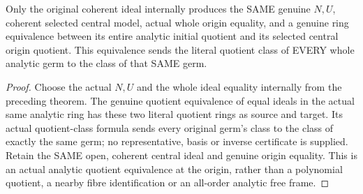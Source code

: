 \begin{theorem}
\label{hir:relative-normal-graph-central-literal-analytic-quotient}
\leanok
Only the original coherent ideal internally produces the SAME genuine $N,U$, coherent selected central model, actual whole origin equality, and a genuine ring equivalence between its entire analytic initial quotient and its selected central origin quotient. This equivalence sends the literal quotient class of EVERY whole analytic germ to the class of that SAME germ.
\end{theorem}
\begin{proof}
Choose the actual $N,U$ and the whole ideal equality internally from the preceding theorem. The genuine quotient equivalence of equal ideals in the actual same analytic ring has these two literal quotient rings as source and target. Its actual quotient-class formula sends every original germ's class to the class of exactly the same germ; no representative, basis or inverse certificate is supplied. Retain the SAME open, coherent central ideal and genuine origin equality. This is an actual analytic quotient equivalence at the origin, rather than a polynomial quotient, a nearby fibre identification or an all-order analytic free frame.
\end{proof}

